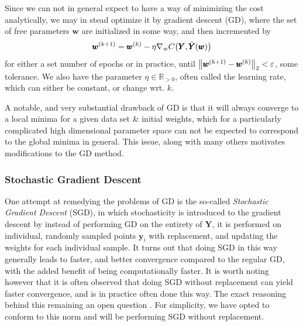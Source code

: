 \documentclass[reprint, english, nofootinbib]{revtex4-2}
\begin{document}
Since we can not in general expect to have a way of minimizing the cost analytically, we may in stead optimize it by gradient descent (GD), where the set of free parameters $\pmb w$ are initialized in some way, and then incremented by
\begin{equation}\label{eqn: GD}
    \pmb w^{(k+1)} = \pmb w^{(k)} - \eta \nabla_{w}C\qty(\pmb Y, \tilde{\pmb Y}(\pmb w))
\end{equation}
for either a set number of epochs or in practice, until $\norm{\pmb w^{(k+1)} - \pmb w^{(k)}}_2< \varepsilon$, some tolerance. We also have the parameter $\eta \in \mathbb R_{>0}$, often called the learning rate, which can either be constant, or change wrt. $k$.

A notable, and very substantial drawback of GD is that it will always converge to a local minima for a given data set \& initial weights, which for a particularly complicated high dimensional parameter space can not be expected to correspond to the global minima in general. This issue, along with many others \cite[pp.15-16]{Mehta_2019} motivates modifications to the GD method.

\subsubsection{Stochastic Gradient Descent}
\noindent
One attempt at remedying the problems of GD is the so-called \textit{Stochastic Gradient Descent} (SGD), in which stochasticity is introduced to the gradient descent by instead of performing GD on the entirety of $\pmb Y$, it is performed on individual, randomly sampled points $\pmb y_i$ with replacement, and updating the weights for each individual sample.
It turns out that doing SGD in this way generally leads to faster, and better convergence compared to the regular GD, with the added benefit of being computationally faster. It is worth noting however that it is often observed that doing SGD without replacement can yield faster convergence, and is in practice often done this way. The exact reasoning behind this remaining an open question \cite{shamir2016withoutreplacement}\cite{pmlr-v97-nagaraj19a}. For simplicity, we have opted to conform to this norm and will be performing SGD without replacement.
\end{document}
